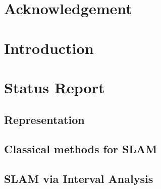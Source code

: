 \documentclass[12pt]{report} %
\begin{document}
\renewcommand{\contentsname}{Contents}	%
\renewcommand{\bibname}{Bibliography}	%




\tableofcontents  %
\cleardoublepage  %


\chapter*{Acknowledgement}
\listoffigures  %
\chapter*{Introduction}

\chapter{Status Report}
\section{Representation}

\section{Classical methods for SLAM}

\section{SLAM via Interval Analysis}
\label{sec:slamIA}

\end{document}
